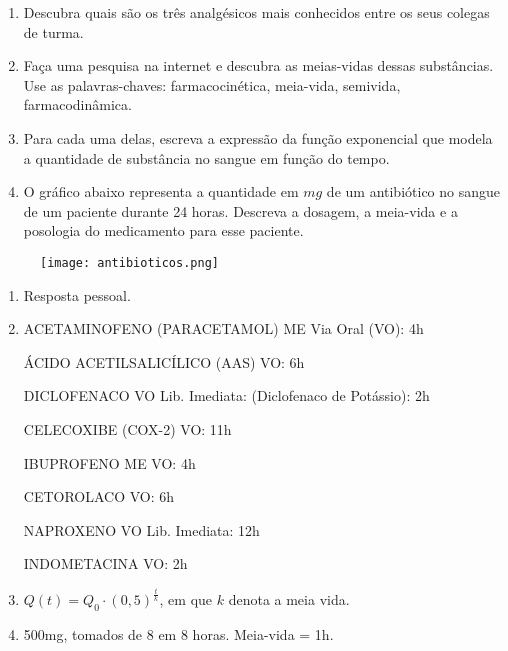 \documentclass[10 pt,usenames,dvipsnames, oneside]{article}
\begin{document}
\begin{enumerate}

\item{} Descubra quais são os três analgésicos mais conhecidos entre os seus colegas de turma.

\item {} Faça uma pesquisa na internet e descubra as meias-vidas dessas substâncias. Use as palavras-chaves: farmacocinética, meia-vida, semivida, farmacodinâmica.

\item {} Para cada uma delas, escreva a expressão da função exponencial que modela a quantidade de substância no sangue em função do tempo.

\item{} O gráfico abaixo representa a quantidade em $mg$ de um antibiótico no sangue de um paciente durante 24 horas. Descreva a dosagem, a meia-vida e a posologia do medicamento para esse paciente.

\end{enumerate}

\begin{figure}[H]
\centering
\texttt{[image: antibioticos.png]}
\end{figure}

\ifdefined\prof
\begin{solucao}

\begin{enumerate}
\item Resposta pessoal.

\item ACETAMINOFENO (PARACETAMOL) ME Via Oral (VO): 4h

ÁCIDO ACETILSALICÍLICO (AAS) VO: 6h 

DICLOFENACO VO Lib. Imediata: (Diclofenaco de Potássio): 2h

CELECOXIBE (COX-2) VO: 11h 

IBUPROFENO ME VO: 4h

CETOROLACO VO: 6h 

NAPROXENO VO Lib. Imediata: 12h 

INDOMETACINA VO: 2h

\item $Q(t)=Q_0\cdot (0{,}5)^{\frac tk}$, em que $k$ denota a meia vida.

\item 5$00$mg, tomados de 8 em 8 horas. Meia-vida = 1h.
\end{enumerate}

\end{solucao}
\fi
\end{document}
